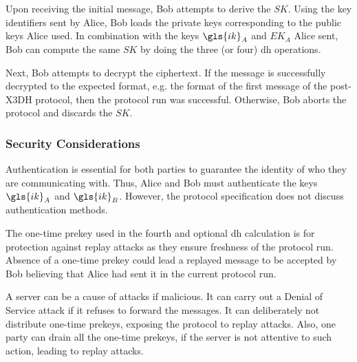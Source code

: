 Upon receiving the initial message, Bob attempts to derive the $ SK $.
Using the key identifiers sent by Alice, Bob loads the private keys corresponding to the public keys Alice used. In combination with the keys $ \gls{ik}_{A} $ and $ EK_{A} $ Alice sent, Bob can compute the same $ SK $ by doing the three (or four) \gls{dh} operations.
\par
Next, Bob attempts to decrypt the ciphertext. If the message is successfully decrypted to the expected format, e.g. the format of the first message of the post-X3DH protocol, then the protocol run was successful. Otherwise, Bob aborts the protocol and discards the $ SK $.

\subsubsection{Security Considerations}
Authentication is essential for both parties to guarantee the identity of who they are communicating with. Thus, Alice and Bob must authenticate the keys $ \gls{ik}_{A} $ and $ \gls{ik}_{B} $. However, the protocol specification does not discuss authentication methods.
\par
The one-time prekey used in the fourth and optional \gls{dh} calculation is for protection against replay attacks as they ensure freshness of the protocol run. Absence of a one-time prekey could lead a replayed message to be accepted by Bob believing that Alice had sent it in the current protocol run.
\par
A server can be a cause of attacks if malicious. It can carry out a Denial of Service attack if it refuses to forward the messages. It can deliberately not distribute one-time prekeys, exposing the protocol to replay attacks. Also, one party can drain all the one-time prekeys, if the server is not attentive to such action, leading to replay attacks.


